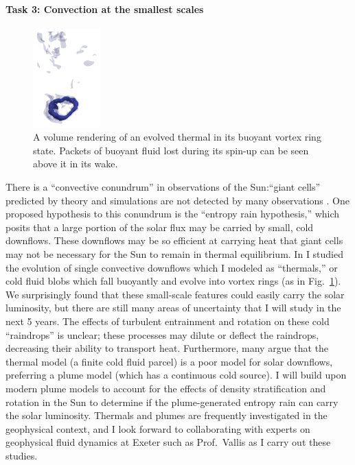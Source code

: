 \documentclass[12pt]{article}
\begin{document}
\paragraph*{Task 3: Convection at the smallest scales}
\begin{figure}
	\begin{center}
	\vspace{-30pt}
    \includegraphics[width=0.23\textwidth]{./figs/turbulent_thermal.png}
	\vspace{-16pt}
	\end{center}
    \caption{ A volume rendering of an evolved thermal in its buoyant vortex ring state.
    Packets of buoyant fluid lost during its spin-up can be seen above it in its wake.
	\label{fig:thermal} }
\end{figure}
There is a ``convective conundrum'' in observations of the Sun:``giant cells'' predicted by theory and simulations are not detected by many observations \citep{hanasoge&all2012,proxauf_2021}.
One proposed hypothesis to this conundrum is the ``entropy rain hypothesis,'' which posits that a large portion of the solar flux may be carried by small, cold downflows.
These downflows may be so efficient at carrying heat that giant cells may not be necessary for the Sun to remain in thermal equilibrium.
In \citet{andersLB2019} I studied the evolution of single convective downflows which I modeled as ``thermals,'' or cold fluid blobs which fall buoyantly and evolve into vortex rings (as in Fig.~\ref{fig:thermal}).
We surprisingly found that these small-scale features could easily carry the solar luminosity, but there are still many areas of uncertainty that I will study in the next 5 years.
The effects of turbulent entrainment and rotation on these cold ``raindrops'' is unclear; these processes may dilute or deflect the raindrops, decreasing their ability to transport heat.
Furthermore, many argue that the thermal model (a finite cold fluid parcel) is a poor model for solar downflows, preferring a plume model (which has a continuous cold source).
I will build upon modern plume models \citep[e.g.,][]{tarshish_romps_2022} to account for the effects of density stratification and rotation in the Sun to determine if the plume-generated entropy rain can carry the solar luminosity.
Thermals and plumes are frequently investigated in the geophysical context, and I look forward to collaborating with experts on geophysical fluid dynamics at Exeter such as Prof.~Vallis as I carry out these studies.


{\small

}
\end{document}
